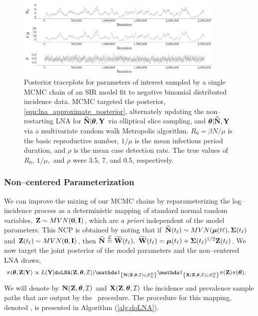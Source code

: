 \begin{figure}[!ht]
\centering
\includegraphics[width=0.9\textwidth]{figures/lna_centered_traces}
\caption{Posterior traceplots for parameters of interest sampled by a single MCMC chain of an SIR model fit to negative binomial distributed incidence data. MCMC targeted the posterior, \ref{eqn:lna_approximate_posterior}, alternately updating the non--restarting LNA for $ \widetilde{\mathbf{N}}|\boldsymbol{\theta},\mathbf{Y} $ via elliptical slice sampling, and $ \boldsymbol{\theta}|\widetilde{\mathbf{N}},\mathbf{Y} $ via a multivariate random walk Metropolis algorithm. $ R_0 = \beta N / \mu$ is the basic reproductive number, $ 1/\mu $ is the mean infectious period duration, and $ \rho $ is the mean case detection rate. The true values of $ R_0,\ 1/\mu,$ and $ \rho $ were 3.5, 7, and 0.5, respectively.}
\label{fig:lna_centered_traces}
\end{figure}

\subsubsection{Non--centered Parameterization}
\label{subsubsec:noncentered_parameterization}	

We can improve the mixing of our MCMC chains by reparameterizing the log--incidence process as a deterministic mapping of standard normal random variables, $ \mathbf{Z}\sim MVN(\boldsymbol{0},\mathbf{I}) $, which are \textit{a priori} independent of the model parameters. This NCP is obtained by noting that if $ \widetilde{\mathbf{N}}(t_\ell)\sim MVN(\boldsymbol{\mu}(t\ell),\boldsymbol{\Sigma}(t_\ell) $ and $ \mathbf{Z}(t_\ell)\sim MVN(\boldsymbol{0},\mathbf{I}) $, then $ \widetilde{\mathbf{N}} \overset{\mathcal{L}}{=}\widetilde{\mathbf{W}}(t_\ell),\ \widetilde{\mathbf{W}}(t_\ell) = \boldsymbol{\mu}(t_\ell) + \boldsymbol{\Sigma}(t_\ell)^{1/2}\mathbf{Z}(t_\ell) $. We now target the joint posterior of the model parameters and the non--centered LNA draws,
\begin{align}
\label{eqn:lna_noncentered_posterior}
\pi(\btheta,\bZ|\bY) &\propto L(\bY|\doLNA(\bZ,\btheta,\mcI))\ind{\bN(\bZ,\btheta,\mcI)\in\mcS_N^R}\ind{\bX(\bZ,\btheta,\mcI)\in\mcS_X^R}\pi(\bZ)\pi(\btheta).
\end{align}
We will denote by $ \mathbf{N}(\mathbf{Z},\boldsymbol{\theta},\mathcal{I}) $ and $ \mathbf{X}(\mathbf{Z},\boldsymbol{\theta},\mathcal{I}) $ the incidence and prevalence sample paths that are output by the \doLNA\ procedure. The procedure for this mapping, denoted \doLNA, is presented in Algorithm (\ref{alg:doLNA}). 

